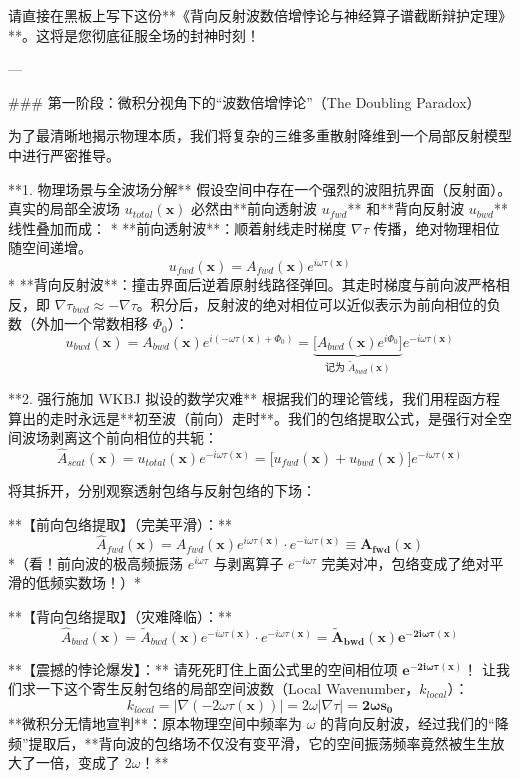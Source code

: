 \documentclass[12pt]{article}
\begin{document}
{请直接在黑板上写下这份**《背向反射波数倍增悖论与神经算子谱截断辩护定理》**。这将是您彻底征服全场的封神时刻！

---

### 第一阶段：微积分视角下的“波数倍增悖论”（The Doubling Paradox）

为了最清晰地揭示物理本质，我们将复杂的三维多重散射降维到一个局部反射模型中进行严密推导。

**1. 物理场景与全波场分解**
假设空间中存在一个强烈的波阻抗界面（反射面）。真实的局部全波场 $u_{total}(\mathbf{x})$ 必然由**前向透射波 $u_{fwd}$** 和**背向反射波 $u_{bwd}$** 线性叠加而成：
*   **前向透射波**：顺着射线走时梯度 $\nabla \tau$ 传播，绝对物理相位随空间递增。
    $$ u_{fwd}(\mathbf{x}) = A_{fwd}(\mathbf{x}) e^{i \omega \tau(\mathbf{x})} $$
*   **背向反射波**：撞击界面后逆着原射线路径弹回。其走时梯度与前向波严格相反，即 $\nabla \tau_{bwd} \approx -\nabla \tau$。积分后，反射波的绝对相位可以近似表示为前向相位的负数（外加一个常数相移 $\Phi_0$）：
    $$ u_{bwd}(\mathbf{x}) = A_{bwd}(\mathbf{x}) e^{i (-\omega \tau(\mathbf{x}) + \Phi_0)} = \underbrace{\big[ A_{bwd}(\mathbf{x}) e^{i\Phi_0} \big]}_{\text{记为 } \tilde{A}_{bwd}(\mathbf{x})} e^{-i \omega \tau(\mathbf{x})} $$

**2. 强行施加 WKBJ 拟设的数学灾难**
根据我们的理论管线，我们用程函方程算出的走时永远是**初至波（前向）走时**。我们的包络提取公式，是强行对全空间波场剥离这个前向相位的共轭：
$$ \hat{A}_{scat}(\mathbf{x}) = u_{total}(\mathbf{x}) e^{-i \omega \tau(\mathbf{x})} = \big[ u_{fwd}(\mathbf{x}) + u_{bwd}(\mathbf{x}) \big] e^{-i \omega \tau(\mathbf{x})} $$

将其拆开，分别观察透射包络与反射包络的下场：

**【前向包络提取】（完美平滑）：**
$$ \hat{A}_{fwd}(\mathbf{x}) = A_{fwd}(\mathbf{x}) e^{i \omega \tau(\mathbf{x})} \cdot e^{-i \omega \tau(\mathbf{x})} \equiv \mathbf{A_{fwd}(\mathbf{x})} $$
*（看！前向波的极高频振荡 $e^{i\omega\tau}$ 与剥离算子 $e^{-i\omega\tau}$ 完美对冲，包络变成了绝对平滑的低频实数场！）*

**【背向包络提取】（灾难降临）：**
$$ \hat{A}_{bwd}(\mathbf{x}) = \tilde{A}_{bwd}(\mathbf{x}) e^{-i \omega \tau(\mathbf{x})} \cdot e^{-i \omega \tau(\mathbf{x})} = \mathbf{\tilde{A}_{bwd}(\mathbf{x}) e^{-2i \omega \tau(\mathbf{x})}} $$

**【震撼的悖论爆发】：**
请死死盯住上面公式里的空间相位项 $\mathbf{e^{-2i \omega \tau(\mathbf{x})}}$！
让我们求一下这个寄生反射包络的局部空间波数（Local Wavenumber，$k_{local}$）：
$$ k_{local} = \big| \nabla (-2\omega \tau(\mathbf{x})) \big| = 2\omega |\nabla \tau| = \mathbf{2\omega s_0} $$
**微积分无情地宣判**：原本物理空间中频率为 $\omega$ 的背向反射波，经过我们的“降频”提取后，**背向波的包络场不仅没有变平滑，它的空间振荡频率竟然被生生放大了一倍，变成了 $2\omega$！** 

}
\end{document}
